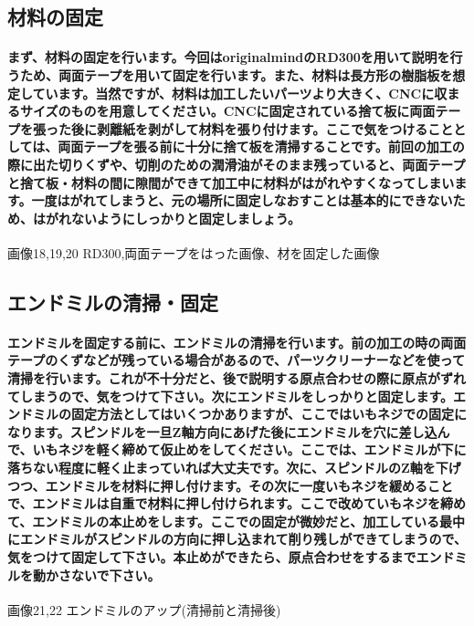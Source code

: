 \documentclass[b5paper, 9pt, twocolumn, titlepage,openany]{jsbook}%
\begin{document}
\subsection{材料の固定}
\paragraph{まず、材料の固定を行います。今回はoriginalmindのRD300を用いて説明を行うため、両面テープを用いて固定を行います。また、材料は長方形の樹脂板を想定しています。当然ですが、材料は加工したいパーツより大きく、CNCに収まるサイズのものを用意してください。CNCに固定されている捨て板に両面テープを張った後に剥離紙を剥がして材料を張り付けます。ここで気をつけることとしては、両面テープを張る前に十分に捨て板を清掃することです。前回の加工の際に出た切りくずや、切削のための潤滑油がそのまま残っていると、両面テープと捨て板・材料の間に隙間ができて加工中に材料がはがれやすくなってしまいます。一度はがれてしまうと、元の場所に固定しなおすことは基本的にできないため、はがれないようにしっかりと固定しましょう。}

画像18,19,20 RD300,両面テープをはった画像、材を固定した画像

\subsection{エンドミルの清掃・固定}
\paragraph{エンドミルを固定する前に、エンドミルの清掃を行います。前の加工の時の両面テープのくずなどが残っている場合があるので、パーツクリーナーなどを使って清掃を行います。これが不十分だと、後で説明する原点合わせの際に原点がずれてしまうので、気をつけて下さい。次にエンドミルをしっかりと固定します。エンドミルの固定方法としてはいくつかありますが、ここではいもネジでの固定になります。スピンドルを一旦Z軸方向にあげた後にエンドミルを穴に差し込んで、いもネジを軽く締めて仮止めをしてください。ここでは、エンドミルが下に落ちない程度に軽く止まっていれば大丈夫です。次に、スピンドルのZ軸を下げつつ、エンドミルを材料に押し付けます。その次に一度いもネジを緩めることで、エンドミルは自重で材料に押し付けられます。ここで改めていもネジを締めて、エンドミルの本止めをします。ここでの固定が微妙だと、加工している最中にエンドミルがスピンドルの方向に押し込まれて削り残しができてしまうので、気をつけて固定して下さい。本止めができたら、原点合わせをするまでエンドミルを動かさないで下さい。}

画像21,22 エンドミルのアップ(清掃前と清掃後)
\end{document}
